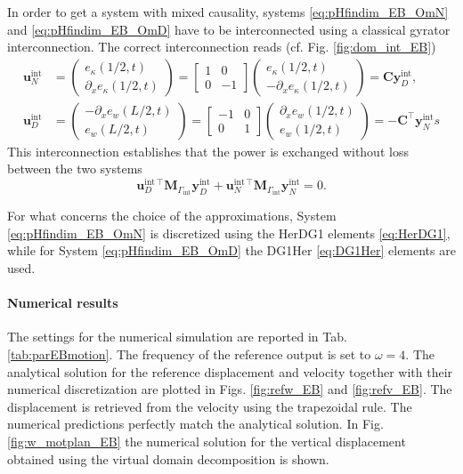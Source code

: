 In order to get a system with mixed causality, systems \eqref{eq:pHfindim_EB_OmN} and \eqref{eq:pHfindim_EB_OmD} have to be interconnected using a classical gyrator interconnection. The correct interconnection reads (cf. Fig. \ref{fig:dom_int_EB})
\begin{align*}
\mathbf{u}_N^{\text{int}} &= 
\begin{pmatrix}
e_\kappa(1/2, t) \\ \partial_x e_\kappa(1/2, t)
\end{pmatrix} = 
\begin{bmatrix}
1 & 0 \\ 0 & -1
\end{bmatrix}\begin{pmatrix}
 e_\kappa(1/2, t) \\ -\partial_x e_\kappa(1/2, t)
 \end{pmatrix} = \mathbf{C} \mathbf{y}_D^{\text{int}}, \\
	\mathbf{u}_D^{\text{int}} &= 
	\begin{pmatrix}
	-\partial_x e_w(L/2, t) \\ e_w(L/2, t)
	\end{pmatrix} = 
	\begin{bmatrix}
	-1 & 0 \\ 0 & 1
	\end{bmatrix}\begin{pmatrix}
	\partial_x e_w(1/2, t) \\ e_w(1/2, t) 
	\end{pmatrix} = -\mathbf{C}^\top \mathbf{y}_N^{\text{int}}
s\end{align*}
This interconnection establishes that the power is exchanged without loss between the two systems
\begin{equation}
\mathbf{u}_D^{\text{int}\, \top} \mathbf{M}_{\Gamma_{\text{int}}} \mathbf{y}_D^{\text{int}} + \mathbf{u}_N^{\text{int}\, \top} \mathbf{M}_{\Gamma_{\text{int}}} \mathbf{y}_N^{\text{int}} = 0.
\end{equation}

For what concerns the choice of the approximations, System \eqref{eq:pHfindim_EB_OmN} is discretized using the HerDG1 elements \eqref{eq:HerDG1}, while for System \eqref{eq:pHfindim_EB_OmD} the DG1Her \eqref{eq:DG1Her} elements are used.



\paragraph{Numerical results}
The settings for the numerical simulation are reported in Tab. \ref{tab:parEBmotion}. The frequency of the reference output is set to $\omega=4$. The analytical solution for the reference displacement and velocity together with their numerical discretization are plotted in Figs. \ref{fig:refw_EB} and \ref{fig:refv_EB}. The displacement is retrieved from the velocity using the trapezoidal rule. The numerical predictions perfectly match the analytical solution. In Fig. \ref{fig:w_motplan_EB} the numerical solution for the vertical displacement obtained using the virtual domain decomposition is shown. 

